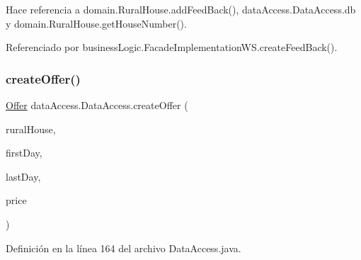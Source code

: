 Hace referencia a domain.\+Rural\+House.\+add\+Feed\+Back(), data\+Access.\+Data\+Access.\+db y domain.\+Rural\+House.\+get\+House\+Number().



Referenciado por business\+Logic.\+Facade\+Implementation\+W\+S.\+create\+Feed\+Back().

\mbox{\label{classdata_access_1_1_data_access_ac07343daf9aa06679c7b28c082950ab0}} 
\subsubsection{\texorpdfstring{createOffer()}{createOffer()}}
{\footnotesize\ttfamily \mbox{\hyperlink{classdomain_1_1_offer}{Offer}} data\+Access.\+Data\+Access.\+create\+Offer (\begin{DoxyParamCaption}\item[{\mbox{\hyperlink{classdomain_1_1_rural_house}{Rural\+House}}}]{rural\+House,  }\item[{Date}]{first\+Day,  }\item[{Date}]{last\+Day,  }\item[{float}]{price }\end{DoxyParamCaption})}



Definición en la línea 164 del archivo Data\+Access.\+java.


